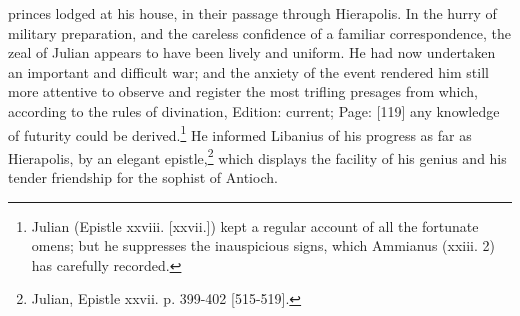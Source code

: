 princes lodged at his house, in their passage through Hierapolis. In the hurry of military preparation, and the careless confidence of a familiar correspondence, the zeal of Julian appears to have been lively and uniform. He had now undertaken an important and difficult war; and the anxiety of the event rendered him still more attentive to observe and register the most trifling presages from which, according to the rules of divination, Edition: current; Page: [119] any knowledge of futurity could be derived.\footnote{Julian (Epistle xxviii. [xxvii.]) kept a regular account of all the fortunate omens; but he suppresses the inauspicious signs, which Ammianus (xxiii. 2) has carefully recorded.} He informed Libanius of his progress as far as Hierapolis, by an elegant epistle,\footnote{Julian, Epistle xxvii. p. 399-402 [515-519].} which displays the facility of his genius and his tender friendship for the sophist of Antioch.

